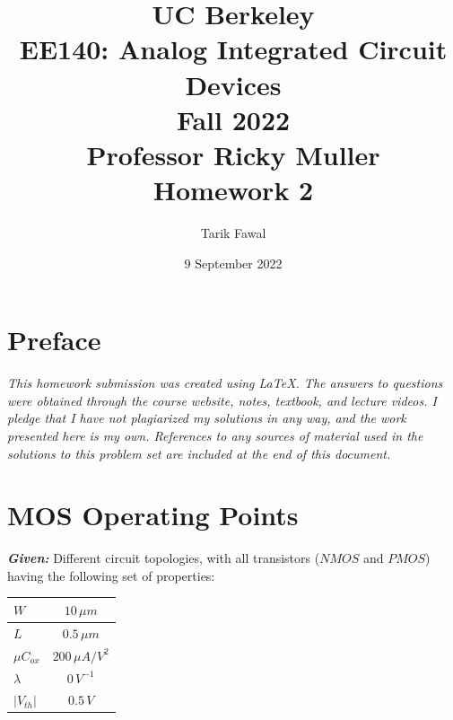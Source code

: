 \documentclass[12pt, fleqn]{article}
\title {
    \normalsize{UC Berkeley}\\
    \large{{EE140: Analog Integrated Circuit Devices\\Fall 2022\\Professor Ricky Muller\\}}
    \vspace{0.5ex}
    \Huge{Homework 2}
    \vspace{0.5ex}
}
\author{Tarik Fawal}
\date{9 September 2022}
\begin{document}
\maketitle
\tableofcontents
\flushbottom
    \section*{Preface}
        \textit{\emph{This homework submission was created using \LaTeX.  The answers to questions were obtained through the course website, notes, textbook, and lecture videos.  I pledge that I have not plagiarized my solutions in any way, and the work presented here is my own.  References to any sources of material used in the solutions to this problem set are included at the end of this document.}}
\newpage
\section{MOS Operating Points}
\textbf{\emph{Given: }} Different circuit topologies, with all transistors ($NMOS$ and $PMOS$) having the following set of properties:

    \begin{table}[H]
    \centering
    \setlength{\tabcolsep}{20pt}
    \renewcommand{\arraystretch}{1.5}
        \begin{tabular}{|l|c|}
            \hline
            $W$ & $10\,\mu m$\\
            \hline
            $L$ & $0.5\,\mu m$\\
            \hline
            $\mu C_{ox}$ & $200\,\mu A/V^2$\\
            \hline
            $\lambda$ & $0\,V^{-1}$\\
            \hline
            $\left|V_{th}\right|$ & $0.5\,V$\\
            \hline
        \end{tabular}
    \end{table}
\end{document}
